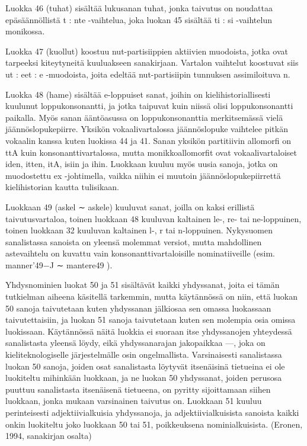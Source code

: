 \documentclass[free]{flammie}
\begin{document}
Luokka 46 (tuhat) sisältää lukusanan tuhat, jonka taivutus on noudattaa epäsäännöllistä t : nte -vaihtelua, joka luokan 45 sisältää ti : si -vaihtelun monikossa.

Luokka 47 (kuollut) koostuu nut-partisiippien aktiivien muodoista, jotka ovat tarpeeksi kiteytyneitä kuuluakseen sanakirjaan. Vartalon vaihtelut koostuvat siis ut :
eet : e -muodoista, joita edeltää nut-partisiipin tunnuksen assimiloituva n.

Luokka 48 (hame) sisältää e-loppuiset sanat, joihin on kielihistoriallisesti kuulunut loppukonsonantti, ja jotka taipuvat kuin niissä olisi loppukonsonantti paikalla. Myös sanan ääntöasussa on loppukonsonanttia merkitsemässä vielä jäännöslopukepiirre. Yksikön vokaalivartalossa jäännöslopuke vaihtelee pitkän vokaalin
kanssa kuten luokissa 44 ja 41. Sanan yksikön partitiivin allomorfi on ttA kuin
konsonanttivartalossa, mutta monikkoallomorfit ovat vokaalivartaloiset iden, itten, itA, isiin ja ihin. Luokkaan kuuluu myös uusia sanoja, jotka on muodostettu
ex -johtimella, vaikka niihin ei muutoin jäännöslopukepiirrettä kielihistorian kautta tulisikaan.

Luokkaan 49 (askel ∼ askele) kuuluvat sanat, joilla on kaksi erillistä taivutusvartaloa, toinen luokkaan 48 kuuluvan kaltainen le-, re- tai ne-loppuinen, toinen
luokkaan 32 kuuluvan kaltainen l-, r tai n-loppuinen. Nykysuomen sanalistassa
sanoista on yleensä molemmat versiot, mutta mahdollinen astevaihtelu on kuvattu
vain konsonanttivartaloisille nominatiiveille (esim. manner’49−J ∼ mantere49 ).

Yhdysnominien luokat 50 ja 51 sisältävät kaikki yhdyssanat, joita ei tämän tutkielman aiheena käsitellä tarkemmin, mutta käytännössä on niin, että luokan 50
sanoja taivutetaan kuten yhdyssanan jälkiosaa sen omassa luokassaan taivutettaisiin, ja luokan 51 sanoja taivutetaan kuten sen molempia osia omissa luokissaan. Käytännössä näitä luokkia ei suoraan itse yhdyssanojen yhteydessä sanalistasta yleensä löydy, eikä yhdyssanarajan jakopaikkaa —, joka on kieliteknologiselle järjestelmälle osin ongelmallista. Varsinaisesti sanalistassa luokan 50 sanoja,
joiden osat sanalistasta löytyvät itsenäisinä tietueina ei ole luokiteltu mihinkään
luokkaan, ja ne luokan 50 yhdyssanat, joiden perusosa puuttuu sanalistasta itsenäisenä tietueena, on pyritty sijoittamaan siihen luokkaan, jonka mukaan varsinainen taivutus on. Luokkaan 51 kuuluu perinteisesti adjektiivialkuisia yhdyssanoja,
ja adjektiivialkuisista sanoista kaikki onkin luokiteltu joko luokkaan 50 tai 51,
poikkeuksena nominialkuisista. (Eronen, 1994, sanakirjan osalta)
\end{document}
